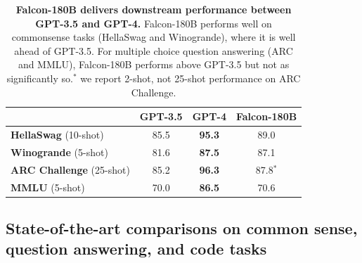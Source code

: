 \documentclass{article}
\DeclareRobustCommand{\performance}[1]{\textcolor{JungleGreen}{#1}}
\begin{document}
\begin{table}[t]
\caption{\textbf{\performance{Falcon-180B delivers downstream performance between GPT-3.5 and GPT-4.}} Falcon-180B performs well on commonsense tasks (HellaSwag and Winogrande), where it is well ahead of GPT-3.5. For multiple choice question answering (ARC and MMLU), Falcon-180B performs above GPT-3.5 but not as significantly so.$^*$ we report 2-shot, not 25-shot performance on ARC Challenge.}
\label{tab:gpt4}
\vspace{0.1in}
\centering
\begin{tabular}{lccc}
\toprule
                                 & \textbf{GPT-3.5} & \textbf{GPT-4} & \textbf{Falcon-180B} \\ \midrule
\textbf{HellaSwag} (10-shot)     & 85.5             & \textbf{95.3}           & 89.0                 \\
\textbf{Winogrande} (5-shot)     & 81.6             & \textbf{87.5}           & 87.1                 \\
\textbf{ARC Challenge} (25-shot) & 85.2             & \textbf{96.3}           & 87.8$^*$             \\
\textbf{MMLU} (5-shot)           & 70.0             & \textbf{86.5}           & 70.6    \\ \bottomrule            
\end{tabular}
\end{table}

\subsection{State-of-the-art comparisons on common sense, question answering, and code tasks}
\label{sec:common_sense}
\end{document}
